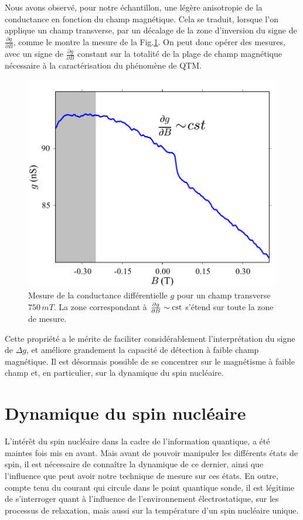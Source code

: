 Nous avons observé, pour notre échantillon, une légère anisotropie de la conductance en fonction du champ magnétique. Cela se traduit, lorsque l'on applique un champ transverse, par un décalage de la zone d'inversion du signe de $\frac{\partial g}{\partial B}$, comme le montre la mesure de la Fig.\ref{TransInfl}. On peut donc opérer des mesures, avec un signe de  $\frac{\partial g}{\partial B}$ constant sur la totalité de la plage de champ magnétique nécessaire à la caractérisation du phénomène de QTM.


\begin{figure}
\parbox{7cm}{
\includegraphics[scale=0.45]{Resultats/TransInfl/TransInfl.pdf} 
}
\parbox{6.5cm}{\caption{Mesure de la conductance différentielle $g$ pour un champ transverse $750\,mT$. La zone correspondant à $\frac{\partial g}{\partial B} \sim \rm{cst}$ s'étend sur toute la zone de mesure.}
\label{TransInfl}
}
\end{figure}




Cette propriété a le mérite de faciliter considérablement l'interprétation du signe de $\Delta g$, et améliore grandement la capacité de détection à faible champ magnétique. Il est désormais possible de se concentrer sur le magnétisme à faible champ et, en particulier, sur la dynamique du spin nucléaire. 

\section{Dynamique du spin nucléaire}
L’intérêt du spin nucléaire dans la cadre de l'information quantique, a été maintes fois mis en avant. Mais avant de pouvoir manipuler les différents états de spin, il est nécessaire de connaître la dynamique de ce dernier, ainsi que l'influence que peut avoir notre technique de mesure sur ces états. En outre, compte tenu du courant qui circule dans le point quantique sonde, il est légitime de s'interroger quant à l'influence de l'environnement électrostatique, sur les processus de relaxation, mais aussi sur la température d'un spin nucléaire unique. 


